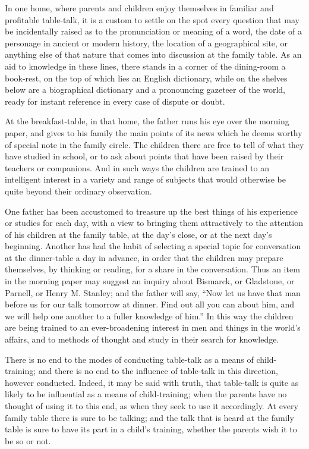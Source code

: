 \documentclass[
]{book}
\begin{document}
In one home, where parents and children enjoy themselves in familiar and profitable table-talk, it is a custom to settle on the spot every question that may be incidentally raised as to the pronunciation or meaning of a word, the date of a personage in ancient or modern history, the location of a geographical site, or anything else of that nature that comes into discussion at the family table. As an aid to knowledge in these lines, there stands in a corner of the dining-room a book-rest, on the top of which lies an English dictionary, while on the shelves below are a biographical dictionary and a pronouncing gazeteer of the world, ready for instant reference in every case of dispute or doubt.

At the breakfast-table, in that home, the father runs his eye over the morning paper, and gives to his family the main points of its news which he deems worthy of special note in the family circle. The children there are free to tell of what they have studied in school, or to ask about points that have been raised by their teachers or companions. And in such ways the children are trained to an intelligent interest in a variety and range of subjects that would otherwise be quite beyond their ordinary observation.

One father has been accustomed to treasure up the best things of his experience or studies for each day, with a view to bringing them attractively to the attention of his children at the family table, at the day's close, or at the next day's beginning. Another has had the habit of selecting a special topic for conversation at the dinner-table a day in advance, in order that the children may prepare themselves, by thinking or reading, for a share in the conversation. Thus an item in the morning paper may suggest an inquiry about Bismarck, or Gladstone, or Parnell, or Henry M. Stanley; and the father will say, ``Now let us have that man before us for our talk tomorrow at dinner. Find out all you can about him, and we will help one another to a fuller knowledge of him.'' In this way the children are being trained to an ever-broadening interest in men and things in the world's affairs, and to methods of thought and study in their search for knowledge.

There is no end to the modes of conducting table-talk as a means of child-training; and there is no end to the influence of table-talk in this direction, however conducted. Indeed, it may be said with truth, that table-talk is quite as likely to be influential as a means of child-training; when the parents have no thought of using it to this end, as when they seek to use it accordingly. At every family table there is sure to be talking; and the talk that is heard at the family table is sure to have its part in a child's training, whether the parents wish it to be so or not.
\end{document}
